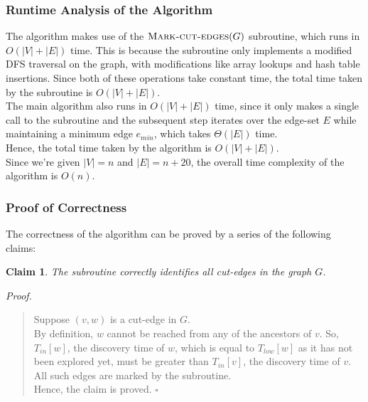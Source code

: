 \documentclass[12pt]{report}
\newtheorem{claim}{Claim}
\begin{document}
    \subsubsection*{Runtime Analysis of the Algorithm}
    The algorithm makes use of the $\Call{Mark-cut-edges}{G}$ subroutine, which runs in $O(|V|+|E|)$ time.
    This is because the subroutine only implements a modified DFS traversal on the graph, with modifications like
    array lookups and hash table insertions. Since both of these operations take constant time, the total time
    taken by the subroutine is $O(|V|+|E|)$.
    \vspace*{10pt} \\
    The main algorithm also runs in $O(|V|+|E|)$ time, since it only makes a single call to the subroutine
    and the subsequent step iterates over the edge-set $E$ while maintaining a minimum edge $e_{min}$, which takes $\Theta(|E|)$ time.
    \vspace*{10pt} \\
    Hence, the total time taken by the algorithm is $O(|V|+|E|)$. \\
    Since we're given $|V| = n$ and $|E| = n + 20$, the overall time complexity of the algorithm is $O(n)$.

    \subsubsection*{Proof of Correctness}
    The correctness of the algorithm can be proved by a series of the following claims:

    \begin{claim}
        The subroutine correctly identifies all cut-edges in the graph $G$.
    \end{claim}
    \textit{Proof.}
    \begin{quote}
        Suppose $(v, w)$ is a cut-edge in $G$. \\
        By definition, $w$ cannot be reached from any of the ancestors of $v$.
        So, $T_{in}[w]$, the discovery time of $w$, which is equal to $T_{low}[w]$ as it has not been explored yet,
        must be greater than $T_{in}[v]$, the discovery time of $v$.
        All such edges are marked by the subroutine. \\
        Hence, the claim is proved. \hfill $\square$
    \end{quote}
\end{document}
